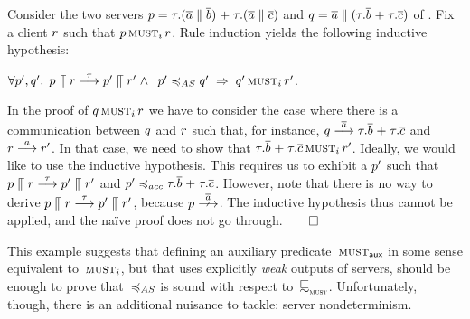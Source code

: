 \begin{example}
  \label{ex:must-set-is-helpful}
  Consider the two servers $p = \tau.(\overline{a} \mathrel{\parallel} \overline{b}) \mathrel{+}
  \tau.(\overline{a} \mathrel{\parallel} \overline{c})$ and $q = \overline{a} \mathrel{\parallel} (\tau.\overline{b} \mathrel{+}
  \tau.\overline{c})$ of .
  Fix a client $r$ such that $p \operatorname{\textsc{must}}_i r$.
  Rule induction %
  yields the following inductive hypothesis:
  \begin{center}
    $\forall p', q' . \,\;
    p \mathrel{\llceil} r \mathrel{\overset{\tau}\longrightarrow} p' \mathrel{\llceil} r' \;\land\;$
    $\serverA' \asleq \serverB' \;\Rightarrow\; \musti{\serverB'}{\client'}$.
  \end{center}
  In the proof of
  $q \operatorname{\textsc{must}}_i r$ we have to consider the case where there
  is a communication between $q$ and
  $r$ such that, for instance, $q \mathrel{\overset{\overline{a}}\longrightarrow}
  \tau.\overline{b} \mathrel{+} \tau.\overline{c}$ and $r \mathrel{\overset{a}\longrightarrow}
  r'$.  In that case, we need to show that $  \tau.\overline{b}
    \mathrel{+} \tau.\overline{c}
   \operatorname{\textsc{must}}_i r'$. Ideally, we would like to use the inductive
  hypothesis. This requires us to exhibit a $p'$ such that $
  p \mathrel{\llceil} r \mathrel{\overset{\tau}\longrightarrow} p' \mathrel{\llceil} r'$ and $
  \server' \bhvleqtwo \tau.\co{b} \extc \tau.\co{c}$.
  However, note that there is no way to derive
  $p \mathrel{\llceil} r \mathrel{\overset{\tau}\longrightarrow} p' \mathrel{\llceil} r'
  $, because $\server
  \Nst{\co{\aa}}$.  The inductive hypothesis thus cannot be applied,
  and the naïve proof does not go through.\hfill$\qed$
\end{example}
\noindent
This example suggests that defining an auxiliary predicate~$\operatorname{\textsc{must}}_{\textsf{aux}}$ in some sense
equivalent to~$\operatorname{\textsc{must}}_i$, but that uses explicitly {\em weak} outputs
of servers, should be enough to prove that~$\asleq$ is sound with respect to~$\testleqS$.
Unfortunately, though, there is an additional nuisance to tackle: server
nondeterminism.

